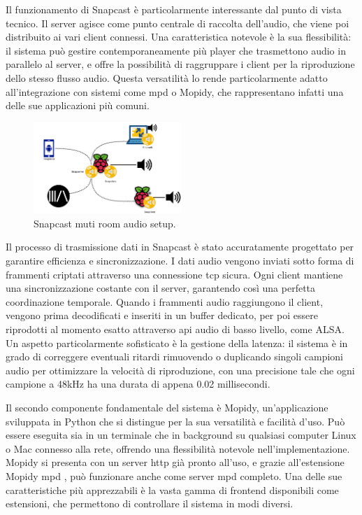 Il funzionamento di Snapcast è particolarmente interessante dal punto di vista tecnico. Il server agisce come punto centrale di raccolta dell'audio, che viene poi distribuito ai vari client connessi. Una caratteristica notevole è la sua flessibilità: il sistema può gestire contemporaneamente più player che trasmettono audio in parallelo al server, e offre la possibilità di raggruppare i client per la riproduzione dello stesso flusso audio. Questa versatilità lo rende particolarmente adatto all'integrazione con sistemi come \gls{mpd} o Mopidy, che rappresentano infatti una delle sue applicazioni più comuni.

\begin{figure}[H]
    \centering
    \includegraphics[width=0.5\textwidth]{Chapters/Figures/snapcast_client.png}
    \caption{\small Snapcast muti room audio setup.} 
    \label{fig:snapcast_client}
\end{figure}

Il processo di trasmissione dati in Snapcast è stato accuratamente progettato per garantire efficienza e sincronizzazione. I dati audio vengono inviati sotto forma di frammenti criptati attraverso una connessione \gls{tcp} sicura. Ogni client mantiene una sincronizzazione costante con il server, garantendo così una perfetta coordinazione temporale. Quando i frammenti audio raggiungono il client, vengono prima decodificati e inseriti in un buffer dedicato, per poi essere riprodotti al momento esatto attraverso \gls{api} audio di basso livello, come ALSA. Un aspetto particolarmente sofisticato è la gestione della latenza: il sistema è in grado di correggere eventuali ritardi rimuovendo o duplicando singoli campioni audio per ottimizzare la velocità di riproduzione, con una precisione tale che ogni campione a 48kHz ha una durata di appena 0.02 millisecondi.

Il secondo componente fondamentale del sistema è Mopidy, un'applicazione sviluppata in Python che si distingue per la sua versatilità e facilità d'uso. Può essere eseguita sia in un terminale che in background su qualsiasi computer Linux o Mac connesso alla rete, offrendo una flessibilità notevole nell'implementazione. Mopidy si presenta con un server \gls{http} già pronto all'uso, e grazie all'estensione Mopidy \gls{mpd} , può funzionare anche come server \gls{mpd} completo. Una delle sue caratteristiche più apprezzabili è la vasta gamma di frontend disponibili come estensioni, che permettono di controllare il sistema in modi diversi.

